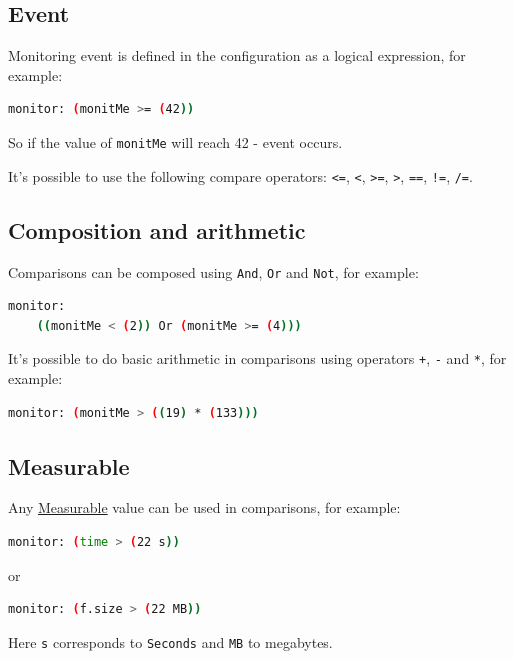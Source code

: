 \begin{mdframed}
\section*{Event}

Monitoring event is defined in the configuration as a logical expression, for example:

\begin{lstlisting}[language=bash]
  monitor: (monitMe >= (42))
\end{lstlisting}

So if the value of \texttt{monitMe} will reach 42 - event occurs.

It's possible to use the following compare operators: \texttt{<=}, \texttt{<}, \texttt{>=}, \texttt{>}, \texttt{==}, \texttt{!=}, \texttt{/=}.

\subsection*{Composition and arithmetic}

Comparisons can be composed using \texttt{And}, \texttt{Or} and \texttt{Not}, for example:

\begin{lstlisting}[language=bash]
  monitor:
    ((monitMe < (2)) Or (monitMe >= (4)))
\end{lstlisting}

It's possible to do basic arithmetic in comparisons using operators \texttt{+}, \texttt{-} and \texttt{*}, for example:

\begin{lstlisting}[language=bash]
  monitor: (monitMe > ((19) * (133)))
\end{lstlisting}
\end{mdframed}

\begin{mdframed}
\section*{Measurable}

Any \href{https://github.com/input-output-hk/iohk-monitoring-framework/blob/master/iohk-monitoring/src/Cardano/BM/Data/Aggregated.lhs}{Measurable} value can be used in comparisons, for example:

\begin{lstlisting}[language=bash]
  monitor: (time > (22 s))
\end{lstlisting}

or

\begin{lstlisting}[language=bash]
  monitor: (f.size > (22 MB))
\end{lstlisting}

Here \texttt{s} corresponds to \texttt{Seconds} and \texttt{MB} to megabytes.
\end{mdframed}

